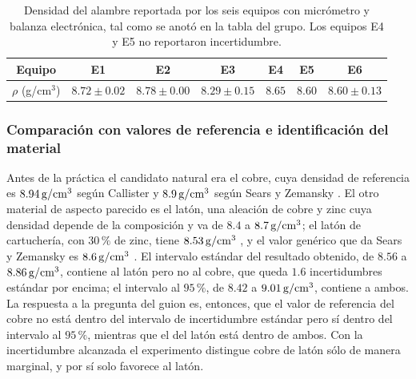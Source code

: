 \begin{table}[H]
    \centering
    \caption{Densidad del alambre reportada por los seis equipos con micrómetro y balanza electrónica, tal como se anotó en la tabla del grupo. Los equipos E4 y E5 no reportaron incertidumbre.}
    \label{tab:alambre_p3}
    \begin{tabular}{c c c c c c c}
        \toprule
        \textbf{Equipo} & E1 & E2 & E3 & E4 & E5 & E6 \\
        \midrule
        $\rho$ (g/cm$^{3}$) & $8.72 \pm 0.02$ & $8.78 \pm 0.00$ & $8.29 \pm 0.15$ & $8.65$ & $8.60$ & $8.60 \pm 0.13$ \\
        \bottomrule
    \end{tabular}
\end{table}

\subsubsection{Comparación con valores de referencia e identificación del material}

Antes de la práctica el candidato natural era el cobre, cuya densidad de referencia es $8.94\,\mathrm{g/cm^{3}}$ según Callister \cite{callister} y $8.9\,\mathrm{g/cm^{3}}$ según Sears y Zemansky \cite{sears}. El otro material de aspecto parecido es el latón, una aleación de cobre y zinc cuya densidad depende de la composición y va de $8.4$ a $8.7\,\mathrm{g/cm^{3}}$; el latón de cartuchería, con $30\,\%$ de zinc, tiene $8.53\,\mathrm{g/cm^{3}}$ \cite{callister}, y el valor genérico que da Sears y Zemansky es $8.6\,\mathrm{g/cm^{3}}$ \cite{sears}. El intervalo estándar del resultado obtenido, de $8.56$ a $8.86\,\mathrm{g/cm^{3}}$, contiene al latón pero no al cobre, que queda $1.6$ incertidumbres estándar por encima; el intervalo al $95\,\%$, de $8.42$ a $9.01\,\mathrm{g/cm^{3}}$, contiene a ambos. La respuesta a la pregunta del guion es, entonces, que el valor de referencia del cobre no está dentro del intervalo de incertidumbre estándar pero sí dentro del intervalo al $95\,\%$, mientras que el del latón está dentro de ambos. Con la incertidumbre alcanzada el experimento distingue cobre de latón sólo de manera marginal, y por sí solo favorece al latón.

